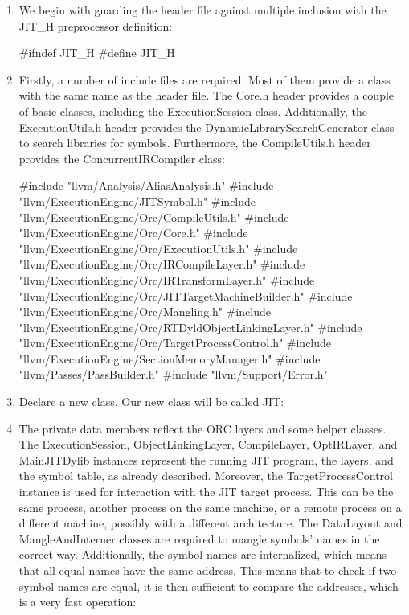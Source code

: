 \begin{enumerate}
\item
We begin with guarding the header file against multiple inclusion with the JIT\_H preprocessor definition:

\begin{cpp}
#ifndef JIT_H
#define JIT_H
\end{cpp}

\item
Firstly, a number of include files are required. Most of them provide a class with the same name as the header file. The Core.h header provides a couple of basic classes, including the ExecutionSession class. Additionally, the ExecutionUtils.h header provides the DynamicLibrarySearchGenerator class to search libraries for symbols. Furthermore, the CompileUtils.h header provides the ConcurrentIRCompiler class:

\begin{cpp}
#include "llvm/Analysis/AliasAnalysis.h"
#include "llvm/ExecutionEngine/JITSymbol.h"
#include "llvm/ExecutionEngine/Orc/CompileUtils.h"
#include "llvm/ExecutionEngine/Orc/Core.h"
#include "llvm/ExecutionEngine/Orc/ExecutionUtils.h"
#include "llvm/ExecutionEngine/Orc/IRCompileLayer.h"
#include "llvm/ExecutionEngine/Orc/IRTransformLayer.h"
#include "llvm/ExecutionEngine/Orc/JITTargetMachineBuilder.h"
#include "llvm/ExecutionEngine/Orc/Mangling.h"
#include "llvm/ExecutionEngine/Orc/RTDyldObjectLinkingLayer.h"
#include "llvm/ExecutionEngine/Orc/TargetProcessControl.h"
#include "llvm/ExecutionEngine/SectionMemoryManager.h"
#include "llvm/Passes/PassBuilder.h"
#include "llvm/Support/Error.h"
\end{cpp}

\item
Declare a new class. Our new class will be called JIT:

\begin{cpp}
class JIT {
\end{cpp}

\item
The private data members reflect the ORC layers and some helper classes. The ExecutionSession, ObjectLinkingLayer, CompileLayer, OptIRLayer, and MainJITDylib instances represent the running JIT program, the layers, and the symbol table, as already described. Moreover, the TargetProcessControl instance is used for interaction with the JIT target process. This can be the same process, another process on the same machine, or a remote process on a different machine, possibly with a different architecture. The DataLayout and MangleAndInterner classes are required to mangle symbols’ names in the correct way. Additionally, the symbol names are internalized, which means that all equal names have the same address. This means that to check if two symbol names are equal, it is then sufficient to compare the addresses, which is a very fast operation:


\end{enumerate}

